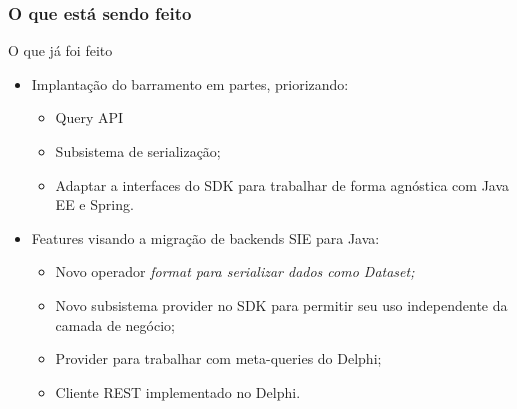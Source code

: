 \documentclass{beamer}
\begin{document}
\begin{frame}
\frametitle{O que está sendo feito}

\begin{exampleblock}{O que já foi feito}
	
	\begin{itemize}
		\item<1->Implantação do barramento em partes, priorizando:
			\begin{itemize}
				\item<1->Query API
				\item<1->Subsistema de serialização;
				\item<1->Adaptar a interfaces do SDK para trabalhar de forma agnóstica com Java EE e Spring. 
			\end{itemize}
		\item<1->Features visando a migração de backends SIE para Java:
			\begin{itemize}
				\item<1->Novo operador \em{format} para serializar dados como Dataset;
				\item<1->Novo subsistema provider no SDK para permitir seu uso independente da camada de negócio;
				\item<1->Provider para trabalhar com meta-queries do Delphi;
				\item<1->Cliente REST implementado no Delphi.
			\end{itemize}
		
	\end{itemize}
	
\end{exampleblock}


\end{frame}
\end{document}
